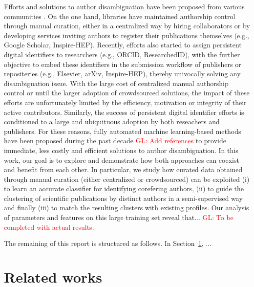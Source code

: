 \documentclass{article}
\newcommand{\glnote}[1]{\textcolor{red}{GL: #1}}
\begin{document}
Efforts and solutions to author disambiguation have been proposed from various
communities \citep{liu2014author}. On the one hand, libraries have maintained
authorship control through manual curation, either in a centralized way by
hiring collaborators or by developing services inviting authors to register
their publications themselves (e.g., Google Scholar, Inspire-HEP). Recently,
efforts also started to assign persistent digital identifiers to researchers
(e.g., ORCID, ResearchedID), with the further objective to embed these
identifiers in the submission workflow of publishers or repositeries (e.g.,
Elsevier, arXiv, Inspire-HEP), thereby univocally solving any disambiguation
issue. With the large cost of centralized manual authorship control or until
the larger adoption of crowdsourced solutions, the impact of these efforts are
unfortunately limited by the efficiency, motivation or integrity of their
active contributors. Similarly, the success of persistent digital identifier
efforts is conditioned to a large and ubiquituous adoption by both reseachers and publishers.
For these reasons, fully automated machine learning-based methods have been
proposed during the past decade \glnote{Add references} to provide immediate, less costly
and efficient solutions to author disambiguation. In this work, our goal
is to explore and demonstrate how both approaches can coexist and benefit from
each other.  In particular, we study how curated data obtained through manual
curation (either centralized or crowdsourced) can be exploited (i) to learn an
accurate classifier for identifying corefering authors, (ii) to guide the
clustering of scientific publications by distinct authors in a semi-supervised
way and finally (iii) to match the resulting clusters with existing profiles.
Our analysis of parameters and features on this large training set reveal
that... \glnote{To be completed with actual results.}

The remaining of this report is structured as follows. In Section~\ref{related-works}, ...



\section{Related works}
\label{related-works}


\end{document}
